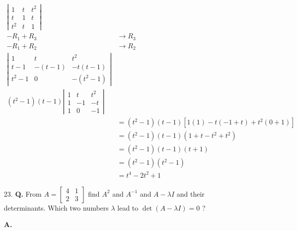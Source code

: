 \documentclass[main.tex]{subfiles}
\begin{document}
\begin{enumerate}
    $$
    \begin{aligned}
    \left|\begin{array}{lll}
    1 & t & t^{2} \\
    t & 1 & t \\
    t^{2} & t & 1
    \end{array}\right|&\\
    -R_1 + R_3 &\rightarrow R_3\\
    -R_1 + R_2 &\rightarrow R_2\\
    \left|\begin{array}{ccc}
    1 & t & t^{2} \\
    t-1 & -(t-1) & -t(t-1) \\
    t^{2}-1 & 0 & -\left(t^{2}-1\right)
    \end{array}\right|& \\
    \left(t^{2}-1\right)(t-1)\left|\begin{array}{ccc}
    1 & t & t^{2} \\
    1 & -1 & -t \\
    1 & 0 & -1
    \end{array}\right|&\\
    &=\left(t^{2}-1\right)(t-1)\left[1(1)-t(-1+t)+t^{2}(0+1)\right] \\
    &=\left(t^{2}-1\right)(t-1)\left(1+t-t^{2}+t^{2}\right) \\
    &=\left(t^{2}-1\right)(t-1)(t+1) \\
    &=\left(t^{2}-1\right)\left(t^{2}-1\right) \\
    &=t^{4}-2 t^{2}+1
    \end{aligned}
    $$
    
    \item [23.] \textbf{Q.} From $A=\left[\begin{array}{ll}4 & 1 \\ 2 & 3\end{array}\right]$ find $A^{2}$ and $A^{-1}$ and $A-\lambda I$ and their determinants. Which two numbers $\lambda$ lead to $\operatorname{det}(A-\lambda I)=0$ ? 
    
    \textbf{A.}
    

\end{enumerate}
\end{document}
